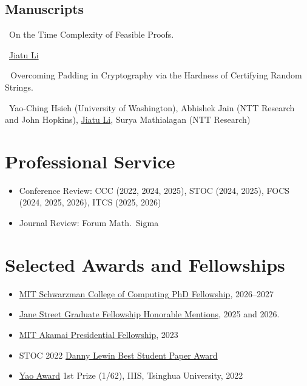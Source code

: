 \documentclass[a4paper, 11pt]{article}
\begin{document}
\vspace{-5pt}

\subsection*{Manuscripts}


 \tagpf\ On the Time Complexity of Feasible Proofs. 

\ \underline{Jiatu Li} 

\vspace{\pubskip}

 \tagcr\,\tagpf\ Overcoming Padding in Cryptography via the Hardness of Certifying Random Strings.
    
\ Yao-Ching Hsieh (University of Washington), Abhishek Jain (NTT Research and John Hopkins), \underline{Jiatu Li}, Surya Mathialagan (NTT Research)





\section{Professional Service}
\begin{itemize}[itemsep=-3pt,parsep=3pt,topsep=-5pt]
    \item Conference Review: \textsf{CCC} (2022, 2024, 2025), \textsf{STOC} (2024, 2025), \textsf{FOCS} (2024, 2025, 2026), \textsf{ITCS} (2025, 2026)
    \item Journal Review: Forum Math.~Sigma
\end{itemize}

\vspace{-5pt}

\section{Selected Awards and Fellowships}
\begin{itemize}[itemsep=-3pt,parsep=3pt,topsep=-5pt]
    \item \href{https://computing.mit.edu/scc-phd-fellowships/}{MIT Schwarzman College of Computing PhD Fellowship}, 2026--2027
    \item \href{https://www.janestreet.com/join-jane-street/programs-and-events/grf-profiles-2025/}{Jane Street Graduate Fellowship Honorable Mentions}, 2025 and 2026.
     \item \href{https://web.mit.edu/provost/presfellow/}{MIT Akamai Presidential Fellowship}, 2023
        \item \textsf{STOC 2022} \href{https://sigact.org/prizes/student.html}{Danny Lewin Best Student Paper Award}
        \item \href{https://iiis.tsinghua.edu.cn/en/Yao_Class/About_Yao_Class.htm}{Yao Award} 1st Prize (1/62), IIIS, Tsinghua University, 2022 
\end{itemize}
\end{document}
